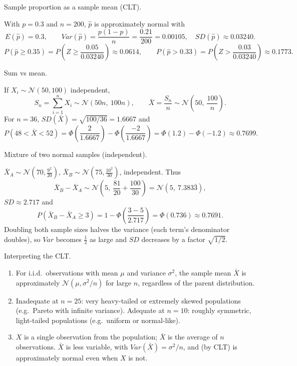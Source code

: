 \documentclass[11pt]{article}
\def\textbf#1{#1}%
\def\mathbb#1{#1}%
\def\mathrm#1{#1}%
\begin{document}
\begin{solution}
\textbf{Sample proportion as a sample mean (CLT).}

With $p=0.3$ and $n=200$, $\hat p$ is approximately normal with
\[
\mathbb E(\hat p)=0.3,\qquad \mathrm{Var}(\hat p)=\frac{p(1-p)}{n}=\frac{0.21}{200}=0.00105,\quad
\mathrm{SD}(\hat p)\approx 0.03240.
\]
\[
P(\hat p\ge 0.35)=P\!\left(Z\ge \frac{0.05}{0.03240}\right)\approx \boxed{0.0614},\qquad
P(\hat p>0.33)=P\!\left(Z>\frac{0.03}{0.03240}\right)\approx \boxed{0.1773}.
\]
\end{solution}

\begin{solution}
\textbf{Sum vs mean.}

If $X_i\sim\mathcal N(50,100)$ independent,
\[
S_n=\sum_{i=1}^n X_i \sim \mathcal N(50n,\ 100n),\qquad
\bar X=\frac{S_n}{n}\sim \mathcal N\!\left(50,\ \frac{100}{n}\right).
\]
For $n=36$, $\mathrm{SD}(\bar X)=\sqrt{100/36}=1.6667$ and
\[
P(48<\bar X<52)=\Phi\!\left(\frac{2}{1.6667}\right)-\Phi\!\left(\frac{-2}{1.6667}\right)
=\Phi(1.2)-\Phi(-1.2)\approx \boxed{0.7699}.
\]
\end{solution}

\begin{solution}
\textbf{Mixture of two normal samples (independent).}

$\bar X_A\sim\mathcal N\!\left(70,\frac{9^2}{20}\right)$, $\bar X_B\sim\mathcal N\!\left(75,\frac{10^2}{30}\right)$, independent.
Thus
\[
\bar X_B-\bar X_A \sim \mathcal N\!\left(5,\ \frac{81}{20}+\frac{100}{30}\right)
=\mathcal N\!\left(5,\ 7.383\bar3\right),
\]
$\mathrm{SD}\approx 2.717$ and
\[
P(\bar X_B-\bar X_A\ge 3)=1-\Phi\!\left(\frac{3-5}{2.717}\right)=\Phi(0.736)\approx \boxed{0.7691}.
\]
Doubling both sample sizes halves the variance (each term’s denominator doubles), so $\mathrm{Var}$ becomes $\tfrac12$ as large and $\mathrm{SD}$ decreases by a factor $\sqrt{1/2}$.
\end{solution}

\begin{solution}
\textbf{Interpreting the CLT.}

\begin{enumerate}
  \item For i.i.d.\ observations with mean $\mu$ and variance $\sigma^2$, the sample mean $\bar X$ is approximately $\mathcal N\!\left(\mu,\sigma^2/n\right)$ for large $n$, regardless of the parent distribution.
  \item Inadequate at $n=25$: very heavy-tailed or extremely skewed populations (e.g.\ Pareto with infinite variance). Adequate at $n=10$: roughly symmetric, light-tailed populations (e.g.\ uniform or normal-like).
  \item $X$ is a single observation from the population; $\bar X$ is the average of $n$ observations. $\bar X$ is less variable, with $\mathrm{Var}(\bar X)=\sigma^2/n$, and (by CLT) is approximately normal even when $X$ is not.
\end{enumerate}
\end{solution}
\end{document}
